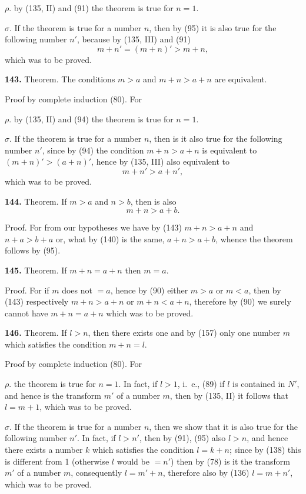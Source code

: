 \documentclass[oneside]{book}
\newcommand\mypara{\medskip\textbf}
\begin{document}
$\rho$. by (135, II) and (91) the theorem is true for
$n = 1$.

$\sigma$. If the theorem is true for a number $n$, then by
(95) it is also true for the following number $n'$, because
by (135, III) and (91)
\[
m+n'=(m+n)'>m+n,
\]
which was to be proved.

\mypara{143.} Theorem. The conditions $m>a$ and $m+n>
a+n$ are equivalent.

Proof by complete induction (80). For

$\rho$. by (135, II) and (94) the theorem is true for
$n = 1$.

$\sigma$. If the theorem is true for a number $n$, then is it
also true for the following number $n'$, since by (94)
the condition $m+n>a+n$ is equivalent to $(m+n)'>
(a+n)'$, hence by (135, III) also equivalent to
\[
m+n'> a+n',
\]
which was to be proved.


\mypara{144.} Theorem. If $m>a$ and $n>b$, then is also
\[
m+n>a+b.
\]

Proof. For from our hypotheses we have by (143)
$m+n>a+n$ and $n+a>b+a$ or, what by (140) is
the same, $a+n>a+b$, whence the theorem follows
by (95).

\mypara{145.} Theorem. If $m+n=a+n$ then $m=a$.

Proof. For if $m$ does not $=a$, hence by (90) either
$m>a$ or $m<a$, then by (143) respectively $m+n>
a+n$ or $m+n<a+n$, therefore by (90) we surely
cannot have $m+n=a+n$ which was to be proved.

\mypara{146.} Theorem. If $l>n$, then there exists one and
by (157) only one number $m$ which satisfies the condition
$m+n=l$.

Proof by complete induction (80). For

$\rho$. the theorem is true for $n = 1$. In fact, if $l>1$,
i.~e., (89) if $l$ is contained in $N'$, and hence is the
transform $m'$ of a number $m$, then by (135, II) it follows
that $l=m+1$, which was to be proved.

$\sigma$. If the theorem is true for a number $n$, then we
show that it is also true for the following number $n'$.
In fact, if $l>n'$, then by (91), (95) also $l>n$, and hence
there exists a number $k$ which satisfies the condition
$l=k+n$; since by (138) this is different from 1 (otherwise
$l$ would be $=n'$) then by (78) is it the transform
$m'$ of a number $m$, consequently $l=m'+n$, therefore
also by (136) $l=m+n'$, which was to be proved.
\end{document}
